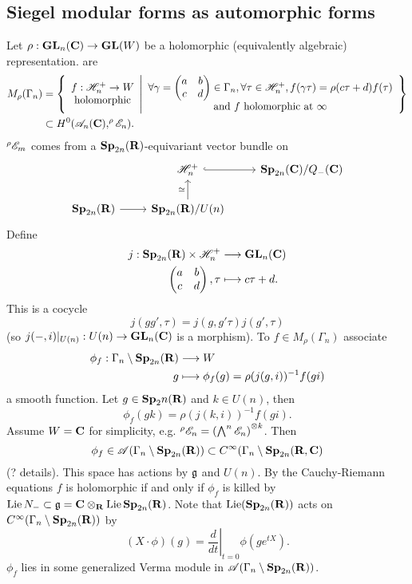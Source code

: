 \subsection{Siegel modular forms as automorphic forms}
Let $\rho:\GL_n(\C)\to \GL(W)$ be a holomorphic (equivalently algebraic) representation.  are
\begin{align*}
	M_\rho(\Gamma_n) &= \left\{ \begin{array}{c} f:\H_n^{+}\to W \\ \text{holomorphic} \end{array} \middle| \begin{array}{c}
		\forall \gamma = \begin{pmatrix} a & b \\ c & d \end{pmatrix} \in \Gamma_n,\forall \tau\in \H_n^{+}, f(\gamma \tau) = \rho(c\tau+d)f(\tau)\\
		\text{and }f\text{ holomorphic at }\infty
	\end{array} \right\} \\
			 &\subset H^{0}(\CA_n(\C),^{\rho}\CE_n).
\end{align*}
$^{\rho}\mathscr{E}_m$ comes from a $\mathbf{Sp}_{2n}(\mathbf{R})$-equivariant vector bundle on 
\[
\begin{tikzcd}
	& \H_n^{+} \ar[r,hook] & \Sp_{2n}(\C) /Q_-(\C) \\
	\Sp_{2n}(\R) \ar[r] & \Sp_{2n}(\R) /U(n) \ar[u,"\isoto"]
\end{tikzcd}
\] 
Define
\begin{align*}
	j: \mathbf{Sp}_{2n}(\mathbf{R})\times \mathscr H_n^{+} &\longrightarrow \mathbf{GL}_n(\mathbf{C}) \\
	\begin{pmatrix} a & b \\ c & d \end{pmatrix} , \tau &\longmapsto c\tau + d
.\end{align*}
This is a cocycle
\[
	j(gg',\tau) = j(g,g'\tau)j(g',\tau)
\] 
(so $j(-,i)|_{U(n)}:U(n)\to \GL_n(\C)$ is a morphism). To $f\in M_\rho(\Gamma_n)$ associate
\begin{align*}
	\phi_f: \Gamma_n \setminus \mathbf{Sp}_{2n}(\mathbf{R}) &\longrightarrow W \\
	g &\longmapsto \phi_f(g) = \rho(j(g,i))^{-1}f(gi)
\end{align*}
a smooth function. Let $g\in \mathbf{Sp}_2n(\mathbf{R})$ and $k\in U(n)$, then
\[
\phi_f(gk) = \rho(j(k,i))^{-1}f(gi).
\]
Assume $W=\mathbf{C}$ for simplicity, e.g. $^{\rho}\mathscr{E}_n = \left( \bigwedge^{n}\mathscr{E}_n \right) ^{\otimes k}$. Then 
\[
	\phi_f\in \mathscr{A}(\Gamma_n\setminus \mathbf{Sp}_{2n}(\mathbf{R})) \subset C^{\infty}(\Gamma_n\setminus \mathbf{Sp}_{2n}(\mathbf{R}, \mathbf{C})	
\]
(? details). This space has actions by $\mathfrak{g}$ and $U(n)$. By the Cauchy-Riemann equations $f$ is holomorphic if and only if $\phi_f$ is killed by $\operatorname{Lie} N_-\subset \mathfrak{g}=\mathbf{C}\otimes_{\mathbf{R}}\operatorname{Lie} \mathbf{Sp}_{2n}(\mathbf{R})$. Note that $\operatorname{Lie}(\mathbf{Sp}_{2n}(\mathbf{R}))$ acts on $C^{\infty}(\Gamma_n\setminus \mathbf{Sp}_{2n}(\mathbf{R}))$ by
\[
\left( X\cdot \phi \right) (g) = \left.\frac{d}{dt}\right|_{t=0}\phi(ge^{tX}).
\] 
$\phi_f$ lies in some generalized Verma module in $\mathscr{A}(\Gamma_n\setminus \mathbf{Sp}_{2n}(\mathbf{R}))$.

